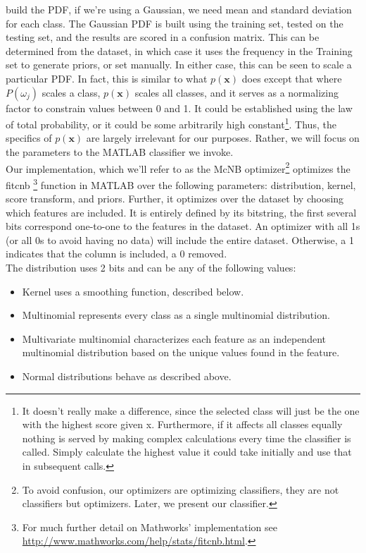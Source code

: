 build the PDF, if we're using a Gaussian, we need mean and standard deviation
for each class.  The Gaussian PDF is built using the training set, tested on the
testing set, and the results are scored in a confusion matrix.  This can be
determined from the dataset, in which case it uses the frequency in the Training
set to generate priors, or set manually.  In either case, this can be seen to
scale a particular PDF.  In fact, this is similar to what $p(\textbf{x})$ does except
that where $P(\omega_j)$ scales a class, $p(\textbf{x})$ scales all classes, and it
serves as a normalizing factor to constrain values between 0 and 1.  It could
be established using the law of total probability, or it could be some
arbitrarily high constant\footnote{It doesn't really make a difference, since the selected class will just be the one with the highest score given x. 	Furthermore, if it affects all classes equally nothing is served by making
complex calculations every time the classifier is called.  Simply calculate the highest value it could take initially and use that in subsequent calls.}.  Thus, the specifics of $p(\textbf{x})$ are largely irrelevant for our purposes.  Rather, we will focus on the parameters to the MATLAB classifier we invoke. \\Our implementation, which we'll refer to as the McNB optimizer\footnote{To avoid confusion, our optimizers are optimizing classifiers, they are not classifiers but optimizers.  Later, we present our classifier.} optimizes the fitcnb  \footnote{For much further
detail on Mathworks' implementation see
\url{http://www.mathworks.com/help/stats/fitcnb.html}.} function in MATLAB over the following parameters: distribution, kernel, score transform, and priors.  Further, it optimizes over the dataset by choosing which features are included.  It is entirely defined by its bitstring, the first several bits correspond one-to-one to the features in the dataset.  An optimizer with all 1s (or all 0s to avoid having no data) will include the entire dataset.  Otherwise, a 1 indicates that the column is included, a 0 removed.
  \\
The distribution uses 2 bits and can be any of the following values:\\
\begin{itemize}
	\item Kernel uses a smoothing function, described below.\item	Multinomial represents every class as a single multinomial distribution.
	\item	Multivariate multinomial characterizes each feature as an independent
	multinomial distribution based on the unique values found in the feature.
	\item	Normal distributions behave as described above.
\end{itemize}
